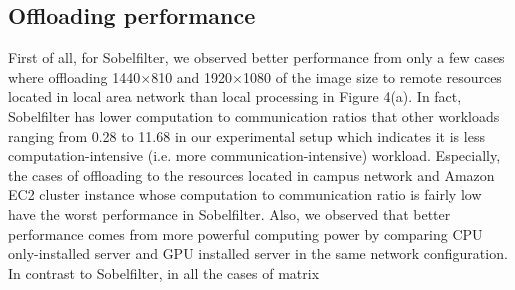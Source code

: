 \documentclass[conference]{IEEEtran}
\begin{document}
\subsection{Offloading performance}
%
%
%
%
%
%
%
%   
First of all, for Sobelfilter, we observed better performance from
only a few cases where offloading 1440$\times$810 and 1920$\times$1080
of the image size to remote resources located in local area network
than local processing in Figure 4(a). 
%
In fact, Sobelfilter has lower computation to communication
ratios that other workloads ranging from 0.28 to 11.68 in our
experimental setup which indicates it is less computation-intensive 
(i.e. more communication-intensive) workload.
%
Especially, the cases of offloading to the resources located in campus
network and Amazon EC2 cluster instance whose computation to
communication ratio is fairly low have the worst performance in
Sobelfilter.  
%
Also, we observed that better performance comes from more powerful
computing power by comparing CPU only-installed server and GPU installed
server in the same network configuration.
%
In contrast to Sobelfilter, in all the cases of matrix
\end{document}
